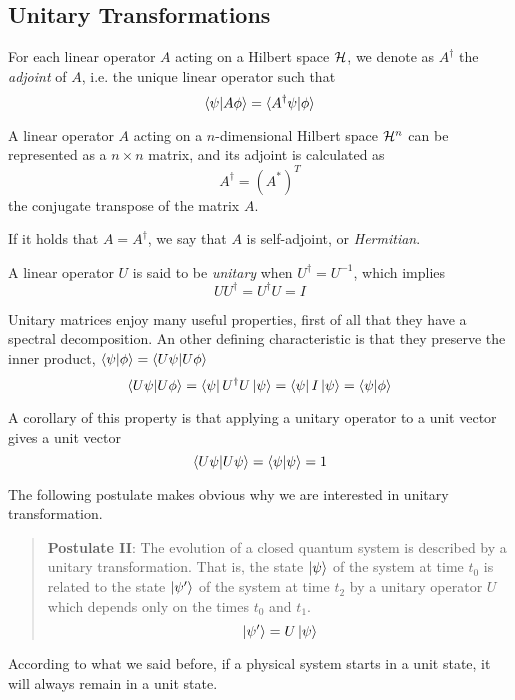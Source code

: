 \subsection{Unitary Transformations}

For each linear operator $A$ acting on a Hilbert space $\mathcal{H}$, we denote as $A^\dagger$ the \textit{adjoint} of $A$, i.e. the unique linear operator such that
\[
	\braket{\psi|A\phi} = \braket{A^\dagger\psi|\phi}
\]

A linear operator $A$ acting on a $n$-dimensional Hilbert space $\mathcal{H}^n$ can be represented as a $n\times n$ matrix, and its adjoint is calculated as 
\[
	A^\dagger = (A^*)^T
\] the conjugate transpose of the matrix $A$.


If it holds that $A = A^\dagger$, we say that $A$ is self-adjoint, or \textit{Hermitian}.

A linear operator $U$ is said to be \textit{unitary} when $U^\dagger = U^{-1}$, which implies 
\[
	UU^\dagger = U^\dagger U = I
\]

Unitary matrices enjoy many useful properties, first of all that they have a spectral decomposition. An other defining characteristic is that they preserve the inner product, $\braket{\psi | \phi} = \braket{U\psi | U\phi}$
\[
	\braket{U\psi | U\phi} = \bra{\psi}U^\dagger U\ket{\psi} = \bra{\psi}I\ket{\psi} = \braket{\psi|\phi}
\]

A corollary of this property is that applying a unitary operator to a unit vector gives a unit vector
\[
	\braket{U\psi | U\psi} = \braket{\psi|\psi} = 1
\]

The following postulate makes obvious why we are interested in unitary transformation.
\begin{quote}
\textbf{Postulate II}: The evolution of a closed quantum system is described by a unitary transformation. That is, the state $\ket{\psi}$ of the system at time $t_0$ is related to the state $\ket{\psi^\prime}$ of the system at time $t_2$ by a unitary operator $U$ which depends only on the times $t_0$ and $t_1$.
\[
	\ket{\psi^\prime} = U\ket{\psi}
\]
\end{quote}

According to what we said before, if a physical system starts in a unit state, it will always remain in a unit state.


